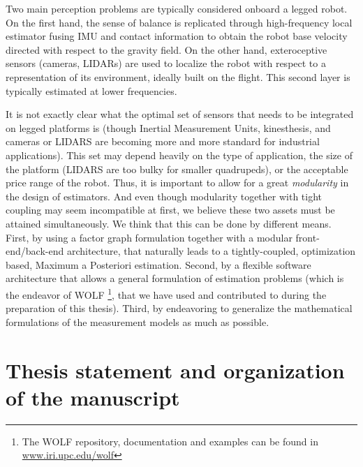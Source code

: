 Two main perception problems are typically considered onboard a legged robot. On the first hand, the sense of balance is replicated through high-frequency
local estimator fusing IMU and contact information to obtain the robot base velocity directed with respect to the gravity field. On the other hand,
exteroceptive sensors (cameras, LIDARs) are used to localize the robot with respect to a representation of its environment, ideally built on the flight.
This second layer is typically estimated at lower frequencies.

It is not exactly clear what the optimal set of sensors that needs to be integrated on legged platforms is (though Inertial Measurement Units, kinesthesis, and 
cameras or LIDARS are becoming more and more standard for industrial applications). This set may depend heavily on the type of application,
the size of the platform (LIDARS are too bulky for smaller quadrupeds), or the acceptable price range of the robot. Thus, it is important to allow
for a great \textit{modularity} in the design of estimators.
And even though modularity together with tight coupling may seem incompatible at first, we believe these two assets must be attained simultaneously.
We think that this can be done by different means. 
First, by using a factor graph formulation together with a modular front-end/back-end architecture, that naturally leads to a tightly-coupled, optimization based, Maximum a Posteriori estimation.
Second, by a flexible software architecture
that allows a general formulation of estimation problems (which is the endeavor of WOLF \cite{sola2021wolf}\footnote{The WOLF repository, documentation and examples can be 
found in \url{www.iri.upc.edu/wolf}}, that we have used and contributed to during the preparation of this thesis). Third, by endeavoring to generalize the mathematical formulations of the measurement models  as much as possible. 
 




\section{Thesis statement and organization of the manuscript}
\label{sec:thesis_organization}

